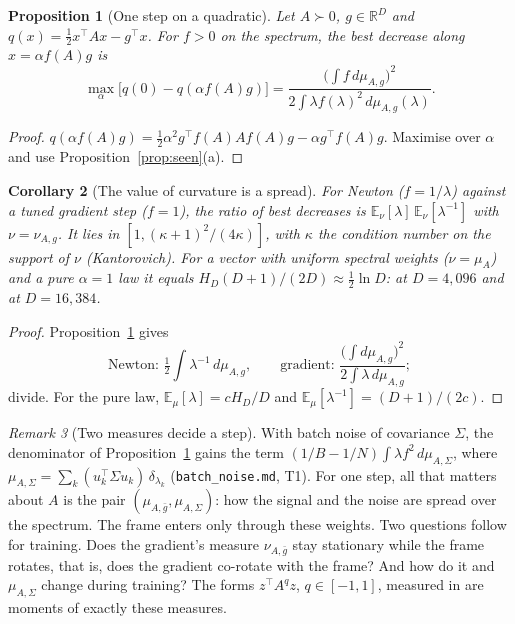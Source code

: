 \documentclass[11pt,a4paper]{article}
\newcommand{\R}{\mathbb{R}}
\newcommand{\E}{\mathbb{E}}
\newcommand{\study}[1]{\path{#1}}
\theoremstyle{plain}
\newtheorem{proposition}{Proposition}[section]
\newtheorem{corollary}[proposition]{Corollary}
\theoremstyle{definition}
\theoremstyle{remark}
\newtheorem{remark}[proposition]{Remark}
\begin{document}
\begin{proposition}[One step on a quadratic]\label{prop:step}
Let $A\succ0$, $g\in\R^D$ and $q(x)=\frac12x^\top Ax-g^\top x$. For $f>0$ on the spectrum, the best decrease along
$x=\alpha f(A)g$ is
\[
\max_\alpha\bigl[q(0)-q(\alpha f(A)g)\bigr]=\frac{\bigl(\int f\,d\mu_{A,g}\bigr)^2}{2\int\lambda f(\lambda)^2\,d\mu_{A,g}(\lambda)}.
\]
\end{proposition}
\begin{proof}
$q(\alpha f(A)g)=\frac12\alpha^2g^\top f(A)Af(A)g-\alpha g^\top f(A)g$. Maximise over $\alpha$ and use
Proposition~\ref{prop:seen}(a).
\end{proof}

\begin{corollary}[The value of curvature is a spread]\label{cor:kantorovich}
For Newton ($f=1/\lambda$) against a tuned gradient step ($f=1$), the ratio of best decreases is
$\E_\nu[\lambda]\,\E_\nu[\lambda^{-1}]$ with $\nu=\nu_{A,g}$. It lies in $[1,(\kappa+1)^2/(4\kappa)]$, with $\kappa$
the condition number on the support of $\nu$ (Kantorovich). For a vector with uniform spectral weights ($\nu=\mu_A$)
and a pure $\alpha=1$ law it equals $H_D(D+1)/(2D)\approx\frac12\ln D$: \NumKantFourK{} at $D=4{,}096$ and
\NumKantSixteenK{} at $D=16{,}384$.
\end{corollary}
\begin{proof}
Proposition~\ref{prop:step} gives
\[
\text{Newton: }\tfrac12\int\lambda^{-1}\,d\mu_{A,g},\qquad
\text{gradient: }\frac{\bigl(\int d\mu_{A,g}\bigr)^2}{2\int\lambda\,d\mu_{A,g}};
\]
divide. For the pure law, $\E_\mu[\lambda]=cH_D/D$ and $\E_\mu[\lambda^{-1}]=(D+1)/(2c)$.
\end{proof}

\begin{remark}[Two measures decide a step]\label{rem:twomeasures}
With batch noise of covariance $\Sigma$, the denominator of Proposition~\ref{prop:step} gains the term
$(1/B-1/N)\int\lambda f^2\,d\mu_{A,\Sigma}$, where $\mu_{A,\Sigma}=\sum_k(u_k^\top\Sigma u_k)\,\delta_{\lambda_k}$
(\texttt{batch\_noise.md}, T1). For one step, all that matters about $A$ is the pair $(\mu_{A,\bar g},\mu_{A,\Sigma})$:
how the signal and the noise are spread over the spectrum. The frame enters only through these weights. Two questions
follow for training. Does the gradient's measure $\nu_{A,\bar g}$ stay stationary while the frame rotates, that is,
does the gradient co-rotate with the frame? And how do it and $\mu_{A,\Sigma}$ change during training? The forms
$z^\top A^qz$, $q\in[-1,1]$, measured in \study{noise_scale_20261021} are moments of exactly these measures.
\end{remark}
\end{document}
